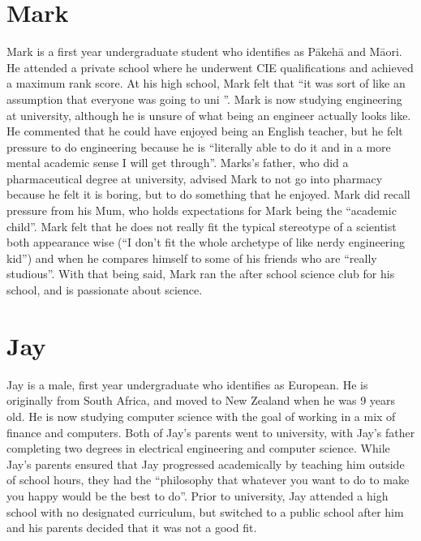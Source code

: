 \section*{Mark}
Mark is a first year undergraduate student who identifies as P\={a}keh\={a} and M\={a}ori. He attended a private school where he underwent CIE qualifications and achieved a maximum rank score. At his high school, Mark felt that ``it was sort of like an assumption that everyone was going to uni ''. Mark is now studying engineering at university, although he is unsure of what being an engineer actually looks like. He commented that he could have enjoyed being an English teacher, but he felt pressure to do engineering because he is ``literally able to do it and in a more mental academic sense I will get through''. Marks's father, who did a pharmaceutical degree at university, advised Mark to not go into pharmacy because he felt it is boring, but to do something that he enjoyed. Mark did recall pressure from his Mum, who holds expectations for Mark being the ``academic child''. Mark felt that he does not really fit the typical stereotype of a scientist both appearance wise (``I don’t fit the whole archetype of like nerdy engineering kid'') and when he compares himself to some of his friends who are ``really studious''. With that being said, Mark ran the after school science club for his school, and is passionate about science. 


\section*{Jay}
Jay is a male, first year undergraduate who identifies as European. He is originally from South Africa, and moved to New Zealand when he was 9 years old. He is now studying computer science with the goal of working in a mix of finance and computers. Both of Jay's parents went to university, with Jay's father completing two degrees in electrical engineering and computer science. While Jay's parents ensured that Jay progressed academically by teaching him outside of school hours, they had the ``philosophy that whatever you want to do to make you happy would be the best to do''. Prior to university, Jay attended a high school with no designated curriculum, but switched to a public school after him and his parents decided that it was not a good fit. 

